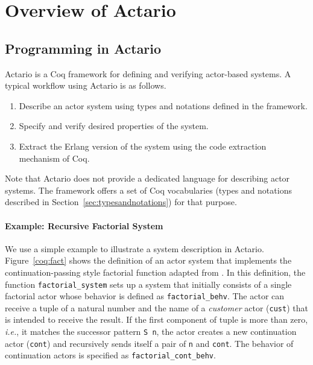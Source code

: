 \section{Overview of Actario}
\label{sec:overview}

\subsection{Programming in Actario}

Actario is a Coq framework for defining and verifying actor-based
systems. A typical workflow using Actario is as follows.
\begin{enumerate}
\item Describe an actor system using types and notations defined in the framework.
\item Specify and verify desired properties of the system.
\item Extract the Erlang version of the system using the code extraction mechanism of Coq.
\end{enumerate}
Note that Actario does not provide a dedicated language for describing
actor systems.  The framework offers a set of Coq vocabularies (types
and notations described in Section~\ref{sec:typesandnotations}) for
that purpose.


\paragraph{Example: Recursive Factorial System}
We use a simple example to illustrate a system description in Actario.
Figure~\ref{coq:fact} shows the definition of an actor system that
implements the continuation-passing style factorial function adapted
from \cite{Agha:1986aa}.  In this definition, the function
\lstinline|factorial_system| sets up a system that initially consists
of a single factorial actor whose behavior is defined as
\lstinline|factorial_behv|.  The actor can receive a tuple of a
natural number and the name of a \emph{customer} actor
(\lstinline|cust|) that is intended to receive the result.  If the
first component of tuple is more than zero, \textit{i.e.}, it matches
the successor pattern \lstinline|S n|, the actor creates a new
continuation actor (\lstinline|cont|) and recursively sends itself a
pair of \lstinline|n| and \lstinline|cont|.  The behavior of
continuation actors is specified as \lstinline|factorial_cont_behv|.

